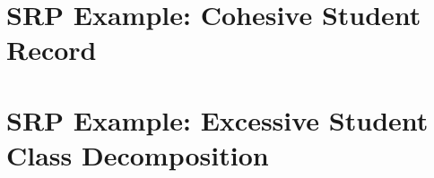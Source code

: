 \documentclass[12pt,a4paper]{article}
\begin{document}
\section{SRP Example: Cohesive Student Record}

\section{SRP Example: Excessive Student Class Decomposition}

\end{document}
